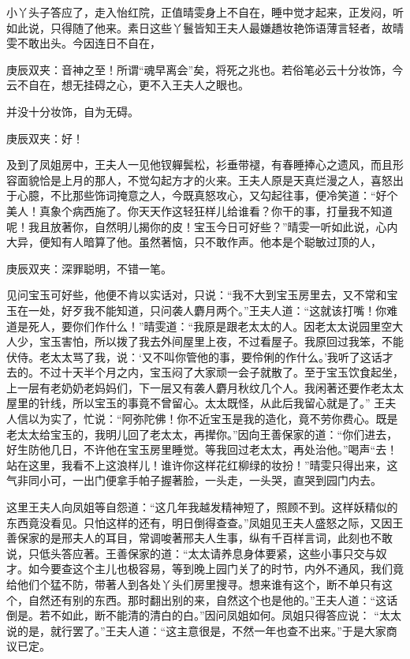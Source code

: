 \begin{parag}
    小丫头子答应了，走入怡红院，正值晴雯身上不自在，睡中觉才起来，正发闷，听如此说，只得随了他来。素日这些丫鬟皆知王夫人最嫌趫妆艳饰语薄言轻者，故晴雯不敢出头。今因连日不自在，\begin{note}庚辰双夹：音神之至！所谓“魂早离会”矣，将死之兆也。若俗笔必云十分妆饰，今云不自在，想无挂碍之心，更不入王夫人之眼也。\end{note}并没十分妆饰，自为无碍。\begin{note}庚辰双夹：好！\end{note}及到了凤姐房中，王夫人一见他钗軃鬓松，衫垂带褪，有春睡捧心之遗风，而且形容面貌恰是上月的那人，不觉勾起方才的火来。王夫人原是天真烂漫之人，喜怒出于心臆，不比那些饰词掩意之人，今既真怒攻心，又勾起往事，便冷笑道：“好个美人！真象个病西施了。你天天作这轻狂样儿给谁看？你干的事，打量我不知道呢！我且放著你，自然明儿揭你的皮！宝玉今日可好些？”晴雯一听如此说，心内大异，便知有人暗算了他。虽然著恼，只不敢作声。他本是个聪敏过顶的人，\begin{note}庚辰双夹：深罪聪明，不错一笔。\end{note}见问宝玉可好些，他便不肯以实话对，只说：“我不大到宝玉房里去，又不常和宝玉在一处，好歹我不能知道，只问袭人麝月两个。”王夫人道：“这就该打嘴！你难道是死人，要你们作什么！”晴雯道：“我原是跟老太太的人。因老太太说园里空大人少，宝玉害怕，所以拨了我去外间屋里上夜，不过看屋子。我原回过我笨，不能伏侍。老太太骂了我，说：‘又不叫你管他的事，要伶俐的作什么。’我听了这话才去的。不过十天半个月之内，宝玉闷了大家顽一会子就散了。至于宝玉饮食起坐，上一层有老奶奶老妈妈们，下一层又有袭人麝月秋纹几个人。我闲著还要作老太太屋里的针线，所以宝玉的事竟不曾留心。太太既怪，从此后我留心就是了。” 王夫人信以为实了，忙说：“阿弥陀佛！你不近宝玉是我的造化，竟不劳你费心。既是老太太给宝玉的，我明儿回了老太太，再撵你。”因向王善保家的道：“你们进去，好生防他几日，不许他在宝玉房里睡觉。等我回过老太太，再处治他。”喝声“去！站在这里，我看不上这浪样儿！谁许你这样花红柳绿的妆扮！”晴雯只得出来，这气非同小可，一出门便拿手帕子握著脸，一头走，一头哭，直哭到园门内去。
\end{parag}


\begin{parag}
    这里王夫人向凤姐等自怨道：“这几年我越发精神短了，照顾不到。这样妖精似的东西竟没看见。只怕这样的还有，明日倒得查查。”凤姐见王夫人盛怒之际，又因王善保家的是邢夫人的耳目，常调唆著邢夫人生事，纵有千百样言词，此刻也不敢说，只低头答应著。王善保家的道：“太太请养息身体要紧，这些小事只交与奴才。如今要查这个主儿也极容易，等到晚上园门关了的时节，内外不通风，我们竟给他们个猛不防，带著人到各处丫头们房里搜寻。想来谁有这个，断不单只有这个，自然还有别的东西。那时翻出别的来，自然这个也是他的。”王夫人道：“这话倒是。若不如此，断不能清的清白的白。”因问凤姐如何。凤姐只得答应说： “太太说的是，就行罢了。”王夫人道：“这主意很是，不然一年也查不出来。”于是大家商议已定。
\end{parag}


